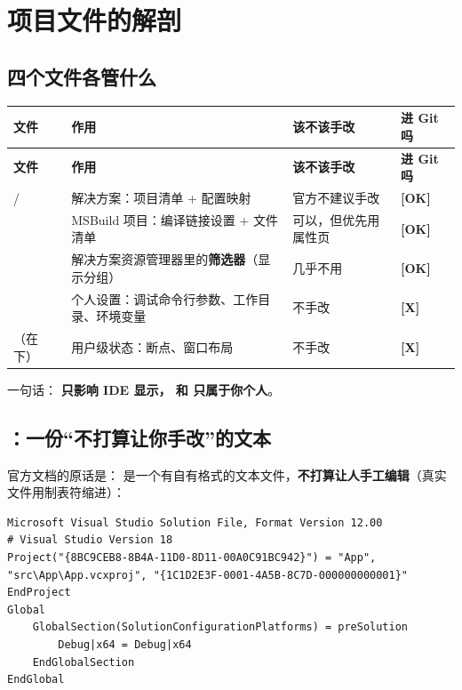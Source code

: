 \section{项目文件的解剖}

\subsection{四个文件各管什么}

\begin{longtable}{L{4.4cm}L{4.6cm}L{2.8cm}L{2.2cm}}
\toprule
\textbf{文件} & \textbf{作用} & \textbf{该不该手改} & \textbf{进 Git 吗} \\
\midrule
\endfirsthead
\toprule
\textbf{文件} & \textbf{作用} & \textbf{该不该手改} & \textbf{进 Git 吗} \\
\midrule
\endhead
\bottomrule
\endlastfoot
{} /  & 解决方案：项目清单 + 配置映射 & 官方不建议手改  & \textbf{[OK]} \\
 & MSBuild 项目：编译链接设置 + 文件清单 & 可以，但优先用属性页 & \textbf{[OK]} \\
 & 解决方案资源管理器里的\textbf{筛选器}（显示分组） & 几乎不用 & \textbf{[OK]} \\
 & 个人设置：调试命令行参数、工作目录、环境变量 & 不手改 & \textbf{[X]} \\
（在  下） & 用户级状态：断点、窗口布局 & 不手改 & \textbf{[X]} \\
\end{longtable}

一句话：\textbf{ 只影响 IDE 显示， 和  只属于你个人}。

\subsection{：一份“不打算让你手改”的文本}

官方文档的原话是： 是一个有自有格式的文本文件，\textbf{不打算让人手工编辑}（真实文件用制表符缩进）：

\begin{lstlisting}[style=textstyle, breaklines=true]
Microsoft Visual Studio Solution File, Format Version 12.00
# Visual Studio Version 18
Project("{8BC9CEB8-8B4A-11D0-8D11-00A0C91BC942}") = "App", "src\App\App.vcxproj", "{1C1D2E3F-0001-4A5B-8C7D-000000000001}"
EndProject
Global
    GlobalSection(SolutionConfigurationPlatforms) = preSolution
        Debug|x64 = Debug|x64
    EndGlobalSection
EndGlobal
\end{lstlisting}

